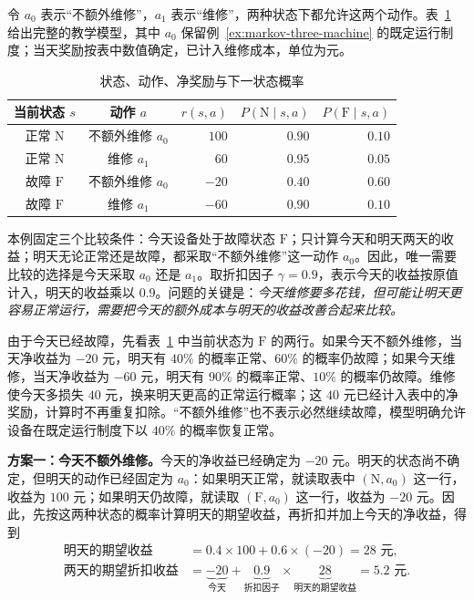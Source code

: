 \documentclass[UTF8,12pt,a4paper,fontset=fandol]{ctexart}
\begin{document}
\begin{example}[维修的短期成本与后续收益]
令 $a_0$ 表示“不额外维修”，$a_1$ 表示“维修”，两种状态下都允许这两个动作。表~\ref{tab:markov-three-maintenance} 给出完整的教学模型，其中 $a_0$ 保留例~\ref{ex:markov-three-machine} 的既定运行制度；当天奖励按表中数值确定，已计入维修成本，单位为元。
\begin{table}[h]
  \centering
  \caption{状态、动作、净奖励与下一状态概率}
  \label{tab:markov-three-maintenance}
  \begin{tabular}{ccrrr}
    \toprule
    当前状态 $s$ & 动作 $a$ & $r(s,a)$ & $P(\mathrm N\mid s,a)$ & $P(\mathrm F\mid s,a)$ \\
    \midrule
    正常 $\mathrm N$ & 不额外维修 $a_0$ & $100$ & $0.90$ & $0.10$ \\
    正常 $\mathrm N$ & 维修 $a_1$ & $60$ & $0.95$ & $0.05$ \\
    故障 $\mathrm F$ & 不额外维修 $a_0$ & $-20$ & $0.40$ & $0.60$ \\
    故障 $\mathrm F$ & 维修 $a_1$ & $-60$ & $0.90$ & $0.10$ \\
    \bottomrule
  \end{tabular}
\end{table}

本例固定三个比较条件：今天设备处于故障状态 $\mathrm F$；只计算今天和明天两天的收益；明天无论正常还是故障，都采取“不额外维修”这一动作 $a_0$。因此，唯一需要比较的选择是今天采取 $a_0$ 还是 $a_1$。取折扣因子 $\gamma=0.9$，表示今天的收益按原值计入，明天的收益乘以 $0.9$。问题的关键是：\emph{今天维修要多花钱，但可能让明天更容易正常运行，需要把今天的额外成本与明天的收益改善合起来比较。}

由于今天已经故障，先看表~\ref{tab:markov-three-maintenance} 中当前状态为 $\mathrm F$ 的两行。如果今天不额外维修，当天净收益为 $-20$ 元，明天有 $40\%$ 的概率正常、$60\%$ 的概率仍故障；如果今天维修，当天净收益为 $-60$ 元，明天有 $90\%$ 的概率正常、$10\%$ 的概率仍故障。维修使今天多损失 $40$ 元，换来明天更高的正常运行概率；这 $40$ 元已经计入表中的净奖励，计算时不再重复扣除。“不额外维修”也不表示必然继续故障，模型明确允许设备在既定运行制度下以 $40\%$ 的概率恢复正常。

\textbf{方案一：今天不额外维修。}今天的净收益已经确定为 $-20$ 元。明天的状态尚不确定，但明天的动作已经固定为 $a_0$：如果明天正常，就读取表中 $(\mathrm N,a_0)$ 这一行，收益为 $100$ 元；如果明天仍故障，就读取 $(\mathrm F,a_0)$ 这一行，收益为 $-20$ 元。因此，先按这两种状态的概率计算明天的期望收益，再折扣并加上今天的净收益，得到
\begin{equation}
  \begin{aligned}
    \text{明天的期望收益}
      &=0.4\times100+0.6\times(-20)=28\text{ 元},\\
    \text{两天的期望折扣收益}
      &=\underbrace{-20}_{\text{今天}}
        +\underbrace{0.9}_{\text{折扣因子}}\times
         \underbrace{28}_{\text{明天的期望收益}}
        =5.2\text{ 元}.
  \end{aligned}
  \label{eq:markov-three-maintenance-no-repair}
\end{equation}


\end{example}
\end{document}
